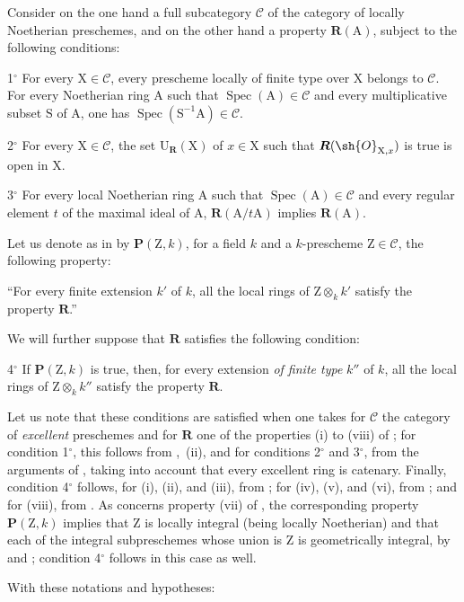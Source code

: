 \begin{env}[7.9.7]
\label{IV.7.9.7}
Consider on the one hand a full subcategory $\mathcal{C}$ of the category of locally Noetherian preschemes, and on the other hand a property $\boldsymbol{R}(\mathrm{A})$, subject to the following conditions:

1${}^\circ$ For every $\mathrm{X}\in\mathcal{C}$, every prescheme locally of finite type over $\mathrm{X}$ belongs to $\mathcal{C}$. For every Noetherian ring $\mathrm{A}$ such that $\operatorname{Spec}(\mathrm{A})\in\mathcal{C}$ and every multiplicative subset $\mathrm{S}$ of $\mathrm{A}$, one has $\operatorname{Spec}(\mathrm{S}^{-1}\mathrm{A})\in\mathcal{C}$.

2${}^\circ$ For every $\mathrm{X}\in\mathcal{C}$, the set $\mathrm{U}_{\boldsymbol{R}}(\mathrm{X})$ of $x\in\mathrm{X}$ such that $\boldsymbol{R}(\sh{O}_{\mathrm{X},x})$ is true is open in $\mathrm{X}$.

3${}^\circ$ For every local Noetherian ring $\mathrm{A}$ such that $\operatorname{Spec}(\mathrm{A})\in\mathcal{C}$ and every regular element $t$ of the maximal ideal of $\mathrm{A}$, $\boldsymbol{R}(\mathrm{A}/t\mathrm{A})$ implies $\boldsymbol{R}(\mathrm{A})$.

Let us denote as in  by $\boldsymbol{P}(\mathrm{Z},k)$, for a field $k$ and a $k$-prescheme $\mathrm{Z}\in\mathcal{C}$, the following property:

``For every finite extension $k'$ of $k$, all the local rings of $\mathrm{Z}\otimes_k k'$ satisfy the property $\boldsymbol{R}$.''


We will further suppose that $\boldsymbol{R}$ satisfies the following condition:

4${}^\circ$ If $\boldsymbol{P}(\mathrm{Z},k)$ is true, then, for every extension \emph{of finite type} $k''$ of $k$, all the local rings of $\mathrm{Z}\otimes_k k''$ satisfy the property $\boldsymbol{R}$.

Let us note that these conditions are satisfied when one takes for $\mathcal{C}$ the category of \emph{excellent} preschemes and for $\boldsymbol{R}$ one of the properties (i) to (viii) of ; for condition 1${}^\circ$, this follows from ,~(ii), and for conditions 2${}^\circ$ and 3${}^\circ$, from the arguments of , taking into account that every excellent ring is catenary. Finally, condition 4${}^\circ$ follows, for (i), (ii), and (iii), from ; for (iv), (v), and (vi), from ; and for (viii), from . As concerns property (vii) of , the corresponding property $\boldsymbol{P}(\mathrm{Z},k)$ implies that $\mathrm{Z}$ is locally integral (being locally Noetherian) and that each of the integral subpreschemes whose union is $\mathrm{Z}$ is geometrically integral, by  and ; condition 4${}^\circ$ follows in this case as well.

With these notations and hypotheses:
\end{env}

